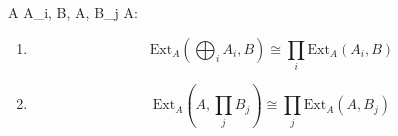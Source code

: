  A  A_i, B, A, B_j  A:

\begin{enumerate}
\item[(i)] $$\text{Ext}_A\left(\bigoplus_i A_i, B\right) \cong \prod_i \text{Ext}_A(A_i, B)$$
\item[(ii)] $$\text{Ext}_A\left(A, \prod_j B_j\right) \cong \prod_j \text{Ext}_A(A, B_j)$$
\end{enumerate}

